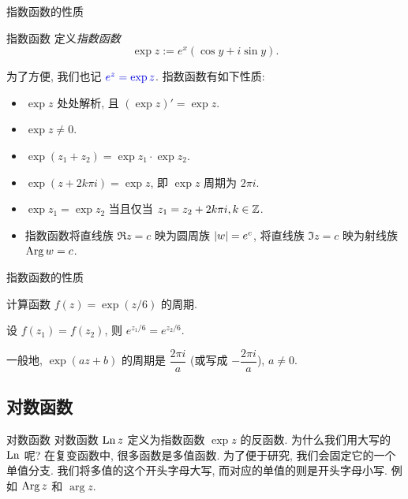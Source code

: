 \begin{frame}{指数函数的性质}
	\onslide<+->
	\begin{definition}{指数函数}
	定义\emph{指数函数}
		\[\exp z:=e^x(\cos y+i\sin y).\]
	\end{definition}
	\onslide<+->
	为了方便, 我们也记 $\emph{e^z=\exp z}$.
	\onslide<+->
	指数函数有如下性质:
	\begin{itemize}
		\item $\exp z$ 处处解析, 且 $(\exp z)'=\exp z$.
		\item $\exp z\neq 0$.
		\item $\exp(z_1+z_2)=\exp z_1\cdot \exp z_2$.
		\item $\exp(z+2k\pi i)=\exp z$, 即 $\exp z$ 周期为 $2\pi i$.
		\item $\exp z_1=\exp z_2$ 当且仅当 $z_1=z_2+2k\pi i,k\in{\mathbb{Z}}$.
		\item 指数函数将直线族 $\Re z=c$ 映为圆周族 $\left|w\right|=e^c$, 将直线族 $\Im z=c$ 映为射线族 $\operatorname{Arg} w=c$.
	\end{itemize}
\end{frame}


\begin{frame}{指数函数的性质}
	\onslide<+->
	\begin{example}
		计算函数 $f(z)=\exp(z/6)$ 的周期.
	\end{example}

	\onslide<+->
	\begin{solution}
		设 $f(z_1)=f(z_2)$, 则 $e^{z_1/6}=e^{z_2/6}$.
		\onslide<+->{%
			所以 $f(z)$ 的周期是 $12\pi i$.
		}
	\end{solution}

	\onslide<+->
	一般地, $\exp(az+b)$ 的周期是 $\dfrac{2\pi i}a$ (或写成 $-\dfrac{2\pi i}a$), $a\neq 0$.
\end{frame}


\subsection{对数函数}

\begin{frame}{对数函数}
	\onslide<+->
	对数函数 $\operatorname{Ln} z$ 定义为指数函数 $\exp z$ 的反函数.
	\onslide<+->
	为什么我们用大写的 $\operatorname{Ln}$ 呢? 
	\onslide<+->
	在复变函数中, 很多函数是多值函数.
	\onslide<+->
	为了便于研究, 我们会固定它的一个单值分支.
	\onslide<+->
	我们将多值的这个开头字母大写, 而对应的单值的则是开头字母小写.
	\onslide<+->
	例如 $\operatorname{Arg} z$ 和 $\arg z$.
\end{frame}


